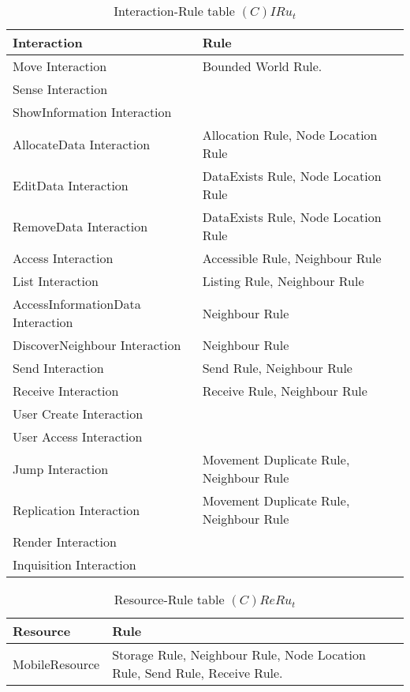 \begin{table}[H]
	\centering
	\begin{tabular}{|p{4cm}|p{8cm}|}
			\hline
			\textbf{Interaction} & \textbf{Rule} \\
			\hline
			Move Interaction & Bounded World Rule. \\
			\hline
			Sense Interaction & \\
			\hline
			ShowInformation Interaction & \\
			\hline
			AllocateData Interaction & Allocation Rule, Node Location Rule \\
			\hline
			EditData Interaction & DataExists Rule, Node Location Rule \\
			\hline
			RemoveData Interaction & DataExists Rule, Node Location Rule \\
			\hline
			Access Interaction & Accessible Rule, Neighbour Rule \\
			\hline
			List Interaction & Listing Rule, Neighbour Rule \\
			\hline
			AccessInformationData Interaction & Neighbour Rule\\
			\hline
			DiscoverNeighbour Interaction & Neighbour Rule\\
			\hline
			Send Interaction & Send Rule, Neighbour Rule\\
			\hline
			Receive Interaction & Receive Rule, Neighbour Rule\\
			\hline
			User Create Interaction & \\
			\hline
			User Access Interaction & \\
			\hline
			Jump Interaction & Movement Duplicate Rule, Neighbour Rule \\
			\hline
			Replication Interaction & Movement Duplicate Rule, Neighbour Rule \\
			\hline
			Render Interaction & \\
			\hline
			Inquisition Interaction & \\
			\hline
		\end{tabular}
	\caption{Interaction-Rule table $(C)IRu_t$}
	\label{tab:cirut}
\end{table}

\begin{table}[H]
	\centering
	\begin{tabular}{|p{4cm}|p{8cm}|}
			\hline
			\textbf{Resource} & \textbf{Rule} \\
			\hline
      MobileResource & Storage Rule, Neighbour Rule, Node Location Rule, Send
      Rule, Receive Rule. \\
			\hline
		\end{tabular}
	\caption{Resource-Rule table $(C)ReRu_t$}
	\label{tab:crerut}
\end{table}

